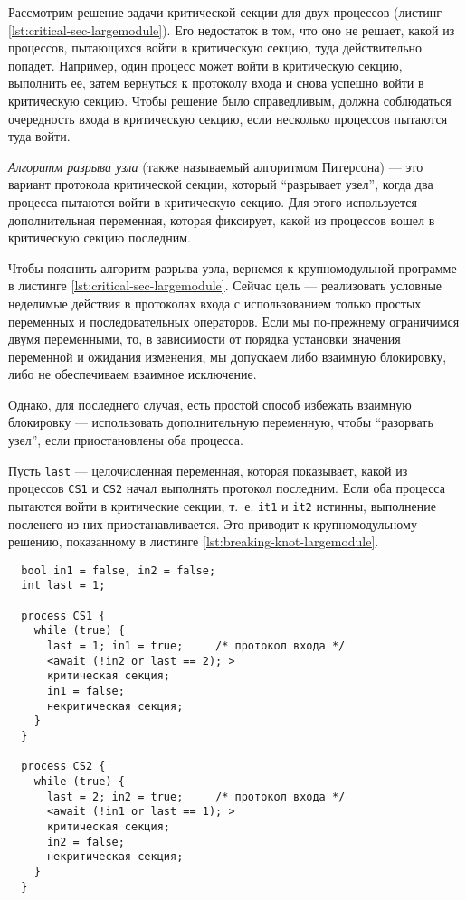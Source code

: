 Рассмотрим решение задачи критической секции для двух процессов (листинг
\ref{lst:critical-sec-largemodule}). Его недостаток в том, что оно не решает,
какой из процессов, пытающихся войти в критическую секцию, туда действительно
попадет. Например, один процесс может войти в критическую секцию, выполнить ее,
затем вернуться к протоколу входа и снова успешно войти в критическую
секцию. Чтобы решение было справедливым, должна соблюдаться очередность входа в
критическую секцию, если несколько процессов пытаются туда войти.

\emph{Алгоритм разрыва узла} (также называемый алгоритмом Питерсона) --- это
вариант протокола критической секции, который ``разрывает узел'', когда два
процесса пытаются войти в критическую секцию. Для этого используется
дополнительная переменная, которая фиксирует, какой из процессов вошел в
критическую секцию последним.

Чтобы пояснить алгоритм разрыва узла, вернемся к крупномодульной программе в
листинге \ref{lst:critical-sec-largemodule}. Сейчас цель --- реализовать
условные неделимые действия в протоколах входа с использованием только простых
переменных и последовательных операторов. Если мы по-прежнему ограничимся двумя
переменными, то, в зависимости от порядка установки значения переменной и
ожидания изменения, мы допускаем либо взаимную блокировку, либо не обеспечиваем
взаимное исключение.

Однако, для последнего случая, есть простой способ избежать взаимную блокировку
--- использовать дополнительную переменную, чтобы ``разорвать узел'', если
приостановлены оба процесса.

Пусть \texttt{last} --- целочисленная переменная, которая показывает, какой из
процессов \texttt{CS1} и \texttt{CS2} начал выполнять протокол последним. Если
оба процесса пытаются войти в критические секции, т.~е. \texttt{it1} и
\texttt{it2} истинны, выполнение посленего из них приостанавливается. Это
приводит к крупномодульному решению, показанному в листинге
\ref{lst:breaking-knot-largemodule}.

\lstset{label=lst:breaking-knot-largemodule,
  caption=Алгоритм разрыва узла для двух процессов: крупномодульное решение}
\begin{lstlisting}
  bool in1 = false, in2 = false;
  int last = 1;

  process CS1 {
    while (true) {
      last = 1; in1 = true;     /* протокол входа */
      <await (!in2 or last == 2); >
      критическая секция;
      in1 = false;
      некритическая секция;
    }
  }

  process CS2 {
    while (true) {
      last = 2; in2 = true;     /* протокол входа */
      <await (!in1 or last == 1); >
      критическая секция;
      in2 = false;
      некритическая секция;
    }
  }
\end{lstlisting}

